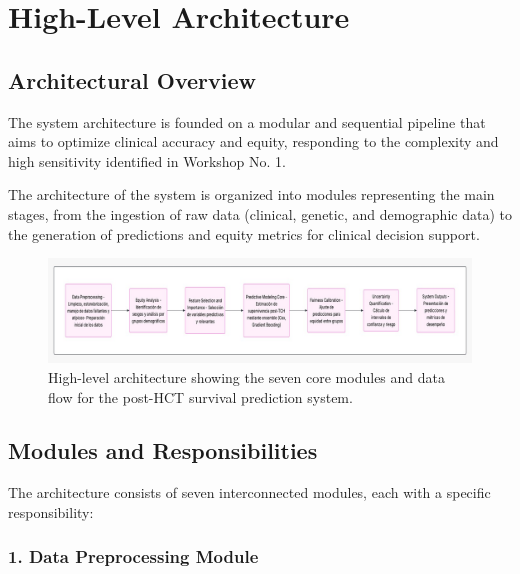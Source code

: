 \section{High-Level Architecture}

\subsection{Architectural Overview}

The system architecture is founded on a modular and sequential pipeline that aims to optimize clinical accuracy and equity, responding to the complexity and high sensitivity identified in Workshop No. 1.

The architecture of the system is organized into modules representing the main stages, from the ingestion of raw data (clinical, genetic, and demographic data) to the generation of predictions and equity metrics for clinical decision support.

\begin{figure}[H]
    \centering
    \includegraphics[width=1\textwidth]{figures/SystemDesignArchitecture.jpg}
    \caption{High-level architecture showing the seven core modules and data flow for the post-HCT survival prediction system.}
    \label{fig:system_architecture_design}
\end{figure}

\subsection{Modules and Responsibilities}

The architecture consists of seven interconnected modules, each with a specific responsibility:

\subsubsection{1. Data Preprocessing Module}

